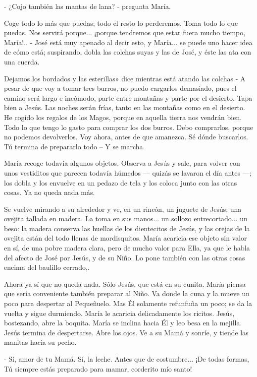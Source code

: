 \documentclass[12pt, twoside, openright]{book} %
\begin{document}
- ¿Cojo también las mantas de lana? - pregunta María. 

Coge todo lo más que puedas; todo el resto lo perderemos. Toma todo lo que puedas. Nos servirá porque... ¡porque tendremos que estar fuera mucho tiempo, María!.. - José está muy apenado al decir esto, y María... se puede uno hacer idea de cómo está; suspirando, dobla las colchas suyas y las de José, y éste las ata con una cuerda. 

Dejamos los bordados y las esterillas» dice mientras está atando las colchas - A pesar de que voy a tomar tres burros, no puedo cargarlos demasiado, pues el camino será largo e incómodo, parte entre montañas y parte por el desierto. Tapa bien a Jesús. Las noches serán frías, tanto en las montañas como en el desierto. He cogido los regalos de los Magos, porque en aquella tierra nos vendrán bien. Todo lo que tengo lo gasto para comprar los dos burros. Debo comprarlos, porque no podemos devolverlos. Voy ahora, antes de que amanezca. Sé dónde buscarlos. Tú termina de prepararlo todo – Y se marcha. 

María recoge todavía algunos objetos. Observa a Jesús y sale, para volver con unos vestiditos que parecen todavía húmedos — quizás se lavaron el día antes —; los dobla y los envuelve en un pedazo de tela y los coloca junto con las otras cosas. Ya no queda nada más. 

Se vuelve mirando a su alrededor y ve, en un rincón, un juguete de Jesús: una ovejita tallada en madera. La toma en sus manos... un sollozo entrecortado... un beso: la madera conserva las huellas de los dientecitos de Jesús, y las orejas de la ovejita están del todo llenas de mordisquitos. María acaricia ese objeto sin valor en sí, de una pobre madera clara, pero de mucho valor para Ella, ya que le habla del afecto de José por Jesús, y de su Niño. Lo pone también con las otras cosas encima del baulillo cerrado,. 

Ahora ya sí que no queda nada. Sólo Jesús, que está en su cunita. María piensa que sería conveniente también preparar al Niño. Va donde la cuna y la mueve un poco para despertar al Pequeñuelo. Mas Él solamente refunfuña un poco; se da la vuelta y sigue durmiendo. María le acaricia delicadamente los ricitos. Jesús, bostezando, abre la boquita. María se inclina hacia Él y leo besa en la mejilla. Jesús termina de despertarse. Abre los ojos. Ve a su Mamá y sonríe, y tiende las manitas hacia su pecho. 

- Sí, amor de tu Mamá. Sí, la leche. Antes que de costumbre... ¡De todas formas, Tú siempre estás preparado para mamar, corderito mío santo! 
\end{document}
